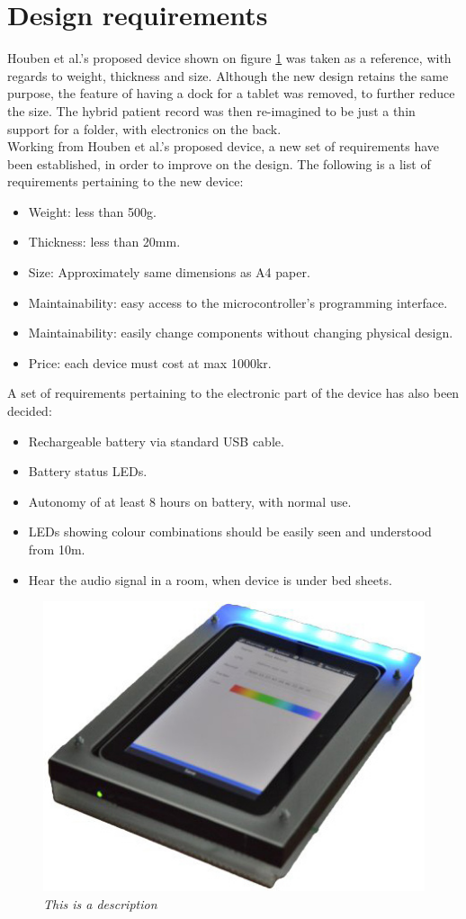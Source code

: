 \section{Design requirements}

Houben et al.'s proposed device shown on figure \ref{fig:old-hypr} was taken as a reference, with regards to weight, thickness and size. Although the new design retains the same purpose, the feature of having a dock for a tablet was removed, to further reduce the size. The hybrid patient record was then re-imagined to be just a thin support for a folder, with electronics on the back. \\

Working from Houben et al.'s proposed device, a new set of requirements have been established, in order to improve on the design. The following is a list of requirements pertaining to the new device:

\begin{itemize} \itemsep0em
	\item Weight: less than 500g.
	\item Thickness: less than 20mm.
	\item Size: Approximately same dimensions as A4 paper.
	\item Maintainability: easy access to the microcontroller's programming interface.
	\item Maintainability: easily change components without changing physical design.
	\item Price: each device must cost at max 1000kr.
\end{itemize}

A set of requirements pertaining to the electronic part of the device has also been decided:

\begin{itemize} \itemsep0em
	\item Rechargeable battery via standard USB cable.
	\item Battery status LEDs.
	\item Autonomy of at least 8 hours on battery, with normal use.
	\item LEDs showing colour combinations should be easily seen and understood from 10m.
	\item Hear the audio signal in a room, when device is under bed sheets.
\end{itemize}

\begin{figure}[h]
\begin{center}
\includegraphics[scale=.5]{figures/old-hypr.jpg}
\caption{\small {\it {This is a description}}} \label{fig:old-hypr}
\end{center}
\end{figure}
